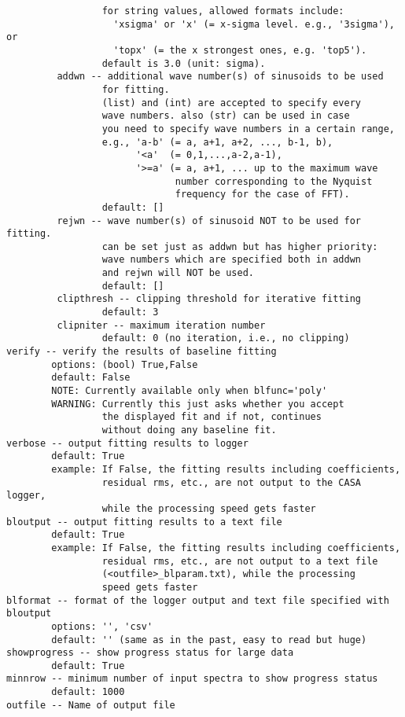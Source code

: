 \begin{verbatim}
                 for string values, allowed formats include:
                   'xsigma' or 'x' (= x-sigma level. e.g., '3sigma'), or
                   'topx' (= the x strongest ones, e.g. 'top5').
                 default is 3.0 (unit: sigma).
         addwn -- additional wave number(s) of sinusoids to be used 
                 for fitting. 
                 (list) and (int) are accepted to specify every
                 wave numbers. also (str) can be used in case
                 you need to specify wave numbers in a certain range,
                 e.g., 'a-b' (= a, a+1, a+2, ..., b-1, b),
                       '<a'  (= 0,1,...,a-2,a-1),
                       '>=a' (= a, a+1, ... up to the maximum wave
                              number corresponding to the Nyquist
                              frequency for the case of FFT).
                 default: []
         rejwn -- wave number(s) of sinusoid NOT to be used for fitting.
                 can be set just as addwn but has higher priority:
                 wave numbers which are specified both in addwn
                 and rejwn will NOT be used. 
                 default: []
         clipthresh -- clipping threshold for iterative fitting
                 default: 3
         clipniter -- maximum iteration number
                 default: 0 (no iteration, i.e., no clipping)
verify -- verify the results of baseline fitting
        options: (bool) True,False
        default: False
        NOTE: Currently available only when blfunc='poly'
        WARNING: Currently this just asks whether you accept
                 the displayed fit and if not, continues
                 without doing any baseline fit.
verbose -- output fitting results to logger
        default: True
        example: If False, the fitting results including coefficients, 
                 residual rms, etc., are not output to the CASA logger, 
                 while the processing speed gets faster
bloutput -- output fitting results to a text file
        default: True
        example: If False, the fitting results including coefficients, 
                 residual rms, etc., are not output to a text file 
                 (<outfile>_blparam.txt), while the processing 
                 speed gets faster
blformat -- format of the logger output and text file specified with bloutput
        options: '', 'csv'
        default: '' (same as in the past, easy to read but huge)
showprogress -- show progress status for large data
        default: True
minnrow -- minimum number of input spectra to show progress status
        default: 1000
outfile -- Name of output file

\end{verbatim}
